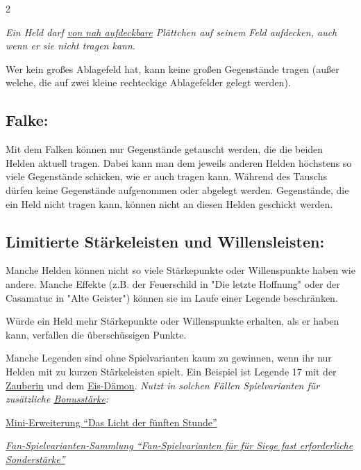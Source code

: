\documentclass[10pt, a4paper, oneside]{book}
\newcommand{\fan}[1]{\textit{#1}}
\begin{document}
\begin{multicols*}{2}
\begin{nobgcolor}
\fan{Ein Held darf \hyperref[aufdecken]{von nah aufdeckbare} Plättchen auf seinem Feld aufdecken, auch wenn er sie nicht tragen kann.}

Wer kein großes Ablagefeld hat, kann keine großen Gegenstände tragen (außer welche, die auf zwei kleine rechteckige Ablagefelder gelegt werden\supercite{dridn-begleitheft}).


\subsection{Falke:}

Mit dem Falken können nur Gegenstände getauscht werden, die die beiden Helden aktuell tragen. Dabei kann man dem jeweils anderen Helden höchstens so viele Gegenstände schicken, wie er auch tragen kann. Während des Tauschs dürfen keine Gegenstände aufgenommen oder abgelegt werden. Gegenstände, die ein Held nicht tragen kann, können nicht an diesen Helden geschickt werden. 
\supercite{1673}







\subsection{Limitierte Stärkeleisten und Willensleisten:}

Manche Helden können nicht so viele Stärkepunkte oder Willenspunkte haben wie andere. Manche Effekte (z.B. der Feuerschild in "Die letzte Hoffnung" oder der Casamatuc in "Alte Geister") können sie im Laufe einer Legende beschränken.

Würde ein Held mehr Stärkepunkte oder Willenspunkte erhalten, als er haben kann, verfallen die überschüssigen Punkte. 

Manche Legenden sind ohne Spielvarianten kaum zu gewinnen, wenn ihr nur Helden mit zu kurzen Stärkeleisten spielt. Ein Beispiel ist Legende 17 mit der \hyperref[zauberin]{Zauberin} und dem \hyperref[eis-daemon]{Eis-Dämon}. \fan{Nutzt in solchen Fällen Spielvarianten für zusätzliche \hyperref[bonusstaerke]{Bonusstärke}:}

\href{https://legenden-von-andor.de/mini-erweiterung-das-licht-der-fuenften-stunde/}
{\blacktriangleright Mini-Erweiterung \enquote{Das Licht der fünften Stunde}}

\href{https://legenden-von-andor.de/forum/viewtopic.php?p=129669#p129669}
{\blacktriangleright \fan{Fan-Spielvarianten-Sammlung \enquote{Fan-Spielvarianten für für Siege fast erforderliche Sonderstärke}}}





\end{nobgcolor}
\end{multicols*}
\end{document}
